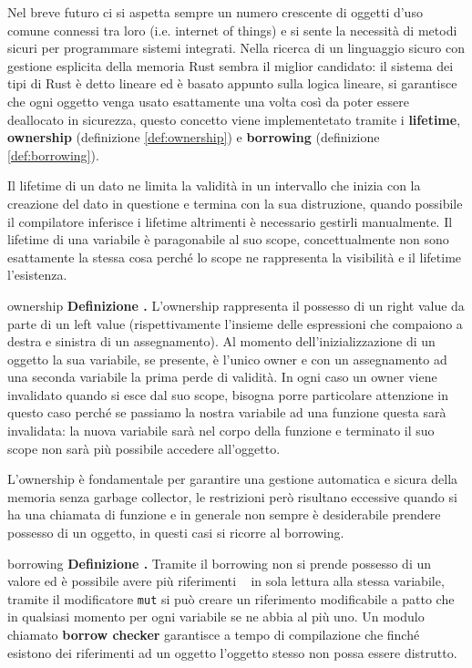 \documentclass[Lau,binding=0.6cm]{sapthesis}
\newenvironment{myDefinition}[2]{ \begin{Definizione}[adjusted title=#1]{}{#2}
    \textbf{Definizione \thetcbcounter.} }{\end{Definizione}}
\begin{document}
Nel breve futuro ci si aspetta sempre un numero crescente di oggetti d'uso comune connessi tra loro (i.e. internet of things) e si sente la necessità di metodi sicuri per programmare sistemi integrati. Nella ricerca di un linguaggio sicuro con gestione esplicita della memoria Rust sembra il miglior candidato: il sistema dei tipi di Rust è detto lineare ed è basato appunto sulla logica lineare, si garantisce che ogni oggetto venga usato esattamente una volta così da poter essere deallocato in sicurezza, questo concetto viene implementetato tramite i \textbf{lifetime}, \textbf{ownership} (definizione \ref{def:ownership}) e \textbf{borrowing} (definizione \ref{def:borrowing}). 

Il lifetime di un dato ne limita la validità in un intervallo che inizia con la creazione del dato in questione e termina con la sua distruzione, quando possibile il compilatore inferisce i lifetime altrimenti è necessario gestirli manualmente. Il lifetime di una variabile è paragonabile al suo scope, concettualmente non sono esattamente la stessa cosa perché lo scope ne rappresenta la visibilità e il lifetime l'esistenza.

\begin{myDefinition}{Ownership}{ownership}
    L'ownership rappresenta il possesso di un right value da parte di un left value (rispettivamente l'insieme delle espressioni che compaiono a destra e sinistra di un assegnamento). Al momento dell'inizializzazione di un oggetto la sua variabile, se presente, è l'unico owner e con un assegnamento ad una seconda variabile la prima perde di validità. In ogni caso un owner viene invalidato quando si esce dal suo scope, bisogna porre particolare attenzione in questo caso perché se passiamo la nostra variabile ad una funzione questa sarà invalidata: la nuova variabile sarà nel corpo della funzione e terminato il suo scope non sarà più possibile accedere all'oggetto.

    
\end{myDefinition}

L'ownership è fondamentale per garantire una gestione automatica e sicura della memoria senza garbage collector, le restrizioni però risultano eccessive quando si ha una chiamata di funzione e in generale non sempre è desiderabile prendere possesso di un oggetto, in questi casi si ricorre al borrowing. 

\begin{myDefinition}{Borrowing}{borrowing}
    Tramite il borrowing non si prende possesso di un valore ed è possibile avere più riferimenti ~\cite[4.2]{rust:language} in sola lettura alla stessa variabile, tramite il modificatore \colorbox{backcolour}{\texttt{mut}} si può creare un riferimento modificabile a patto che in qualsiasi momento per ogni variabile se ne abbia al più uno. Un modulo chiamato \textbf{borrow checker} garantisce a tempo di compilazione che finché esistono dei riferimenti ad un oggetto l'oggetto stesso non possa essere distrutto. 

    
\end{myDefinition}
\end{document}
